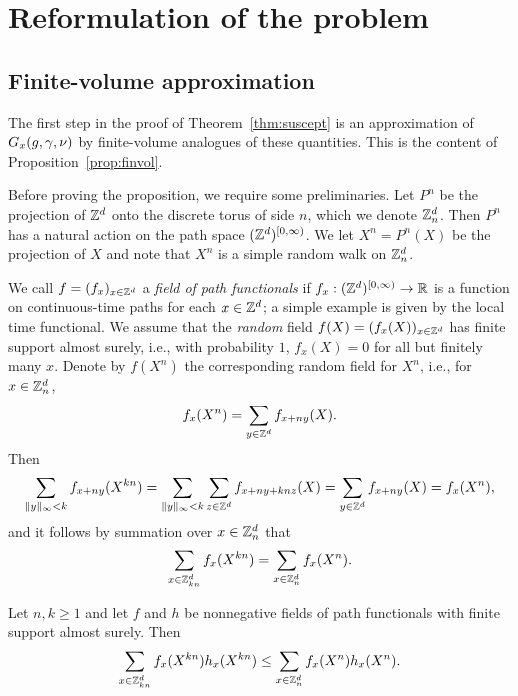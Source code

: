 \chapter{Reformulation of the problem}


\section{Finite-volume approximation}
\label{sec:finvol}

The first step in the proof of Theorem~\ref{thm:suscept}
is an approximation of $G_x(g, \gamma, \nu)$
by finite-volume analogues of these quantities.
This is the content of Proposition~\ref{prop:finvol}.

Before proving the proposition, we require some preliminaries.
Let $P^n$ be the projection
of ${ {{\mathbb Z}}^d }$ onto the discrete torus of side $n$,
which we denote ${\mathbb Z}_n^d$.
Then $P^n$ has a natural action
on the path space $({ {{\mathbb Z}}^d })^{[0,\infty)}$. We let
$X^n = P^n(X)$ be the projection of $X$
and note that $X^n$ is a simple random walk on ${\mathbb Z}^d_n$.

We call $f = (f_x)_{x\in{ {{\mathbb Z}}^d }}$ a \emph{field of path functionals} if
$f_x : ({ {{\mathbb Z}}^d })^{[0,\infty)} \rightarrow {\mathbb R}$ is a function on continuous-time paths
for each $x \in { {{\mathbb Z}}^d }$;
a simple example is given by the local time functional.
We assume that the \emph{random} field $f(X) = (f_x(X))_{x\in{ {{\mathbb Z}}^d }}$
has finite support almost surely, i.e.,
with probability $1$, $f_x(X) = 0$ for all but finitely many $x$.
Denote by $f(X^n)$ the corresponding random field for $X^n$, i.e., for $x \in {\mathbb Z}_n^d$,
\begin{equation}
f_x(X^n) = \sum_{y\in{ {{\mathbb Z}}^d }} f_{x+ny}(X).
\end{equation}
Then
\begin{equation}
\label{e:ffold1}
\sum_{\|y\|_\infty < k} f_{x+ny}(X^{kn})
  = \sum_{\|y\|_\infty < k} \sum_{z\in{ {{\mathbb Z}}^d }} f_{x+ny+knz}(X)
  = \sum_{y\in{ {{\mathbb Z}}^d }} f_{x+ny}(X)
  = f_x(X^n),
\end{equation}
and it follows by summation over $x \in {\mathbb Z}^d_n$ that
\begin{equation}
\label{e:ffold2}
\sum_{x\in{\mathbb Z}^d_{kn}} f_x(X^{kn})
  =
\sum_{x\in{\mathbb Z}^d_n} f_x(X^n).
\end{equation}

\begin{lemma}
\label{lem:mono}
Let $n,k \ge 1$ and let $f$ and $h$ be nonnegative fields of path functionals
with finite support almost surely.
Then
\begin{equation}
\sum_{x\in{\mathbb Z}^d_{kn}} f_x(X^{kn}) h_x(X^{kn})
  \leq
\sum_{x\in{\mathbb Z}^d_n} f_x(X^n) h_x(X^n).
\end{equation}
\end{lemma}

